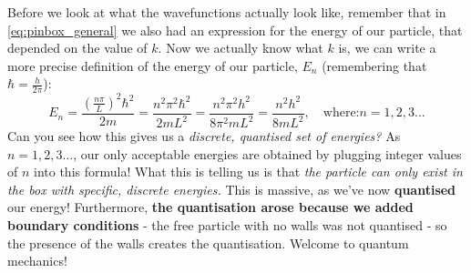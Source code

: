 \documentclass{memoir}[11pt,oneside,a4paper,openany]
\begin{document}
Before we look at what the wavefunctions actually look like, remember that in \autoref{eq:pinbox_general} we also had an expression for the energy of our particle, that depended on the value of $k$. Now we actually know what $k$ is, we can write a more precise definition of the energy of our particle, $E_n$ (remembering that $\hbar = \frac{h}{2\pi}$):
\begin{equation}
	E_n = \frac{(\frac{n\pi}{L})^2\hbar^2}{2m} = \frac{n^2\pi^2\hbar^2}{2mL^2} = \frac{n^2\pi^2h^2}{8\pi^2mL^2} = \frac{n^2h^2}{8mL^2},\quad\text{where:} n=1,2,3... 
\end{equation}
Can you see how this gives us a \emph{discrete, quantised set of energies?} As $n = 1,2,3...$, our only acceptable energies are obtained by plugging integer values of $n$ into this formula! What this is telling us is that \emph{the particle can only exist in the box with specific, discrete energies.} This is massive, as we've now \textbf{quantised} our energy! Furthermore, \textbf{the quantisation arose because we added boundary conditions} - the free particle with no walls was not quantised - so the presence of the walls creates the quantisation. Welcome to quantum mechanics!
\end{document}
